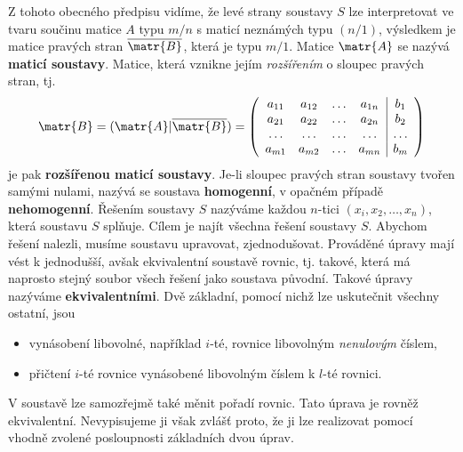       Z tohoto obecného předpisu vidíme, že levé strany soustavy \(S\) lze interpretovat ve tvaru
      součinu matice \(A\) typu \(m/n\) s maticí neznámých typu \((n/1)\), výsledkem je matice
      pravých stran \(\overline{\matr{B}}\), která je typu \(m/1\). Matice \(\matr{A}\) se nazývá
      \textbf{maticí soustavy}. Matice, která vznikne jejím \emph{rozšířením} o sloupec pravých
      stran, tj.
      \begingroup
        \renewcommand\arraystretch{0.8}
        \renewcommand\arraycolsep{3pt}
        \begin{equation*}
          \matr{B} = (\matr{A}\lvert\overline{\matr{B}}) =
          \left(
            \begin{array}{cccc|c}
              a_{11} & a_{12} & \ldots & a_{1n} & b_1    \\
              a_{21} & a_{22} & \ldots & a_{2n} & b_2    \\
              \ldots & \ldots & \ldots & \ldots & \ldots \\
              a_{m1} & a_{m2} & \ldots & a_{mn} & b_m 
            \end{array}
          \right)
        \end{equation*}
      \endgroup
      je pak \textbf{rozšířenou maticí soustavy}. Je-li sloupec pravých stran soustavy tvořen samými
      nulami, nazývá se soustava \textbf{homogenní}, v opačném případě \textbf{nehomogenní}. Řešením
      soustavy \(S\) nazýváme každou \(n\)-tici \((x_i, x_2,\ldots, x_n)\), která soustavu \(S\)
      splňuje. Cílem je najít všechna řešení soustavy \(S\). Abychom řešení nalezli, musíme soustavu
      upravovat, zjednodušovat. Prováděné úpravy mají vést k jednodušší, avšak ekvivalentní soustavě
      rovnic, tj. takové, která má naprosto stejný soubor všech řešení jako soustava původní. Takové
      úpravy nazýváme \textbf{ekvivalentními}. Dvě základní, pomocí nichž lze uskutečnit všechny
      ostatní, jsou
      \begin{mdframed}[style=highlight]
        \begin{itemize}[noitemsep]
          \item vynásobení libovolné, například \(i\)-té, rovnice libovolným \emph{nenulovým}
                číslem,
          \item přičtení \(i\)-té rovnice vynásobené libovolným číslem k \(l\)-té rovnici.
        \end{itemize} 
      \end{mdframed}
      V soustavě lze samozřejmě také měnit pořadí rovnic. Tato úprava je rovněž ekvivalentní.
      Nevypisujeme ji však zvlášť proto, že ji lze realizovat pomocí vhodně zvolené posloupnosti
      základních dvou úprav.
      
